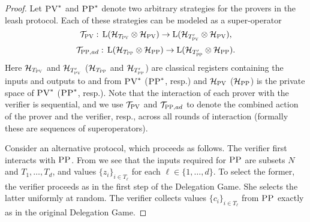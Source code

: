 \documentclass{toc}
\newcommand{\setft}[1]{\mathrm{#1}}
\newcommand{\Lin}{\setft{L}}
\newcommand{\mH}{\mathcal{H}}
\newcommand{\pv}{\textsc{PV}}
\newcommand{\pp}{\textsc{PP}}
\begin{document}
\begin{proof}
Let $\pv^*$ and $\pp^*$ denote two arbitrary strategies for the provers in the leash protocol. Each of these strategies can be modeled as a super-operator 
$$\mathcal{T}_\pv:\, \Lin(\mH_{T_\pv} \otimes \mH_\pv) \to \Lin(\mH_{T'_\pv} \otimes \mH_\pv),$$
$$\mathcal{T}_{\pp,ad}: \,\Lin(\mH_{T_\pp} \otimes \mH_\pp) \to \Lin(\mH_{T'_\pp} \otimes \mH_\pp).$$
Here $\mH_{T_\pv}$ and $\mH_{T'_\pv}$ %
($\mH_{T_\pp}$ and $\mH_{T'_\pp}$) are classical registers containing the inputs and outputs to and from $\pv^*$ %
($\pp^*$, resp.)
and $\mH_\pv$ %
($\mH_\pp$)  %
is the private space of $\pv^*$ %
($\pp^*$, resp.).  %
Note that the interaction of each prover with the verifier is sequential, and we use $\mathcal{T}_{\pv}$ and $\mathcal{T}_{\pp,ad}$ to denote the combined action of the prover and the verifier, resp., %
 across all rounds of interaction (formally these are sequences of superoperators).  %

Consider an alternative protocol, which proceeds as follows. The verifier first interacts with $\pp$. From  we see that the inputs required for $\pp$ are subsets $N$ and $T_1,\ldots,T_d$, and values $\{z_i\}_{i\in T_\ell}$ for each $\ell\in\{1,\ldots,d\}$. To select the former, the verifier proceeds as in the first step of the Delegation Game. She selects the latter uniformly at random. The verifier collects values $\{c_i\}_{i\in T_\ell}$ from $\pp$ exactly as in the original Delegation Game. 


\end{proof}
\end{document}
